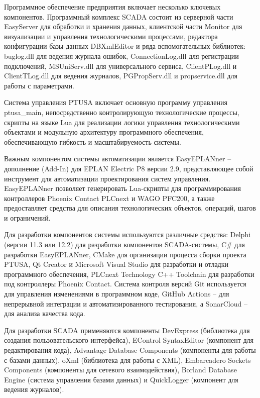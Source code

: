 {  \par \redline Программное обеспечение предприятия включает несколько ключевых компонентов. Программный комплекс SCADA состоит из серверной части EasyServer для обработки и хранения данных, клиентской части Monitor для визуализации и управления технологическими процессами, редактора конфигурации базы данных DBXmlEditor и ряда вспомогательных библиотек: buglog.dll для ведения журнала ошибок, ConnectionLog.dll для регистрации подключений, MSUniServ.dll для универсального сервиса, ClientPLog.dll и ClientTLog.dll для ведения журналов, PGPropServ.dll и propservice.dll для работы с параметрами.

  \par \redline Система управления PTUSA включает основную программу управления ptusa\_main, непосредственно контролирующую технологические процессы, скрипты на языке Lua для реализации логики управления технологическими объектами и модульную архитектуру программного обеспечения, обеспечивающую гибкость и масштабируемость системы.

  \par \redline Важным компонентом системы автоматизации является EasyEPLANner – дополнение (Add-In) для EPLAN Electric P8 версии 2.9, представляющее собой инструмент для автоматизации проектирования систем управления. EasyEPLANner позволяет генерировать Lua-скрипты для программирования контроллеров Phoenix Contact PLCnext и WAGO PFC200, а также предоставляет средства для описания технологических объектов, операций, шагов и ограничений.

  \par \redline Для разработки компонентов системы используются различные средства: Delphi (версии 11.3 или 12.2) для разработки компонентов SCADA-системы, C\# для разработки EasyEPLANner, CMake для организации процесса сборки проекта PTUSA, Qt Creator и Microsoft Visual Studio для разработки и отладки программного обеспечения, PLCnext Technology C++ Toolchain для разработки под контроллеры Phoenix Contact. Система контроля версий Git используется для управления изменениями в программном коде, GitHub Actions – для непрерывной интеграции и автоматизированного тестирования, а SonarCloud – для анализа качества кода.

  \par \redline Для разработки SCADA применяются компоненты DevExpress (библиотека для создания пользовательского интерфейса), EControl SyntaxEditor (компонент для редактирования кода), Advantage Database Components (компоненты для работы с базами данных), oXml (библиотека для работы с XML), Embarcadero Sockets Components (компоненты для сетевого взаимодействия), Borland Database Engine (система управления базами данных) и QuickLogger (компонент для ведения журналов).

}

